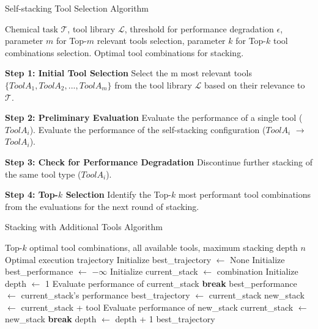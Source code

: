 \begin{algorithm}[H]
\caption{Self-stacking Tool Selection Algorithm}
\label{alg:tool_stacking}
\begin{algorithmic}[1]
\REQUIRE Chemical task $\mathcal{T}$, tool library $\mathcal{L}$, threshold for performance degradation $\epsilon$, parameter $m$ for Top-$m$ relevant tools selection, parameter $k$ for Top-$k$ tool combinations selection.
\ENSURE Optimal tool combinations for stacking.

\STATE \textbf{Step 1: Initial Tool Selection}
\STATE Select the m most relevant tools 
$\{Tool A_1, Tool A_2,...,Tool A_m\}$ from the tool library $\mathcal{L}$ based on their relevance to $\mathcal{T}$.

\STATE \textbf{Step 2: Preliminary Evaluation}
\STATE Evaluate the performance of a single tool ($Tool A_i$).
\STATE Evaluate the performance of the self-stacking configuration ($Tool A_i$ $\to$ $Tool A_i$).

\STATE \textbf{Step 3: Check for Performance Degradation}
    \STATE Discontinue further stacking of the same tool type ($Tool A_i$).
\ENDIF

\STATE \textbf{Step 4: Top-$k$ Selection}
\STATE Identify the Top-$k$ most performant tool combinations from the evaluations for the next round of stacking. 

\end{algorithmic}
\end{algorithm}

\begin{algorithm}[htbp]
\caption{Stacking with Additional Tools Algorithm}
\label{alg:tool_stacking_step2}
\begin{algorithmic}[1]
\REQUIRE Top-$k$ optimal tool combinations, all available tools, maximum stacking depth $n$
\ENSURE Optimal execution trajectory
\STATE Initialize best\_trajectory $\gets$ None
\STATE Initialize best\_performance $\gets$ $-\infty$
    \STATE Initialize current\_stack $\gets$ combination
    \STATE Initialize depth $\gets$ 1
        \STATE Evaluate performance of current\_stack
            \STATE \textbf{break}
        \ENDIF
            \STATE best\_performance $\gets$ current\_stack's performance
            \STATE best\_trajectory $\gets$ current\_stack
        \ENDIF
            \STATE new\_stack $\gets$ current\_stack + tool
            \STATE Evaluate performance of new\_stack
                \STATE current\_stack $\gets$ new\_stack
                \STATE \textbf{break}
            \ENDIF
        \ENDFOR
        \STATE depth $\gets$ depth + 1
    \ENDWHILE
\ENDFOR
\RETURN best\_trajectory
\end{algorithmic}
\end{algorithm}


